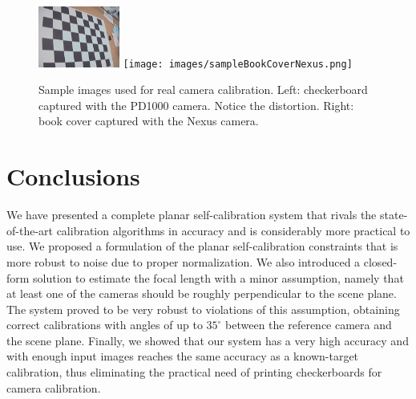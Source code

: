 \documentclass[10pt,twocolumn,letterpaper]{article}
\begin{document}
\begin{figure}
\centering
\includegraphics[height=2cm]{images/sampleOldCam.jpg}
\texttt{[image: images/sampleBookCoverNexus.png]}
\caption{Sample images used for real camera calibration. Left: checkerboard captured with the PD1000 camera. Notice the distortion. Right: book cover captured with the Nexus camera.}
\end{figure}  

\section{Conclusions}

We have presented a complete planar self-calibration system that rivals the state-of-the-art calibration algorithms in accuracy and is considerably more practical to use. We proposed a formulation of the planar self-calibration constraints that is more robust to noise due to proper normalization. We also introduced a closed-form solution to estimate the focal length with a minor assumption, namely that at least one of the cameras should be roughly perpendicular to the scene plane. The system proved to be very robust to violations of this assumption, obtaining correct calibrations with angles of up to $35^\circ$ between the reference camera and the scene plane. Finally, we showed that our system has a very high accuracy and with enough input images reaches the same accuracy as a known-target calibration, thus eliminating the practical need of printing checkerboards for camera calibration.

\clearpage

{\small


}
\end{document}

